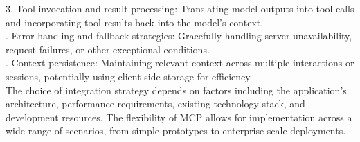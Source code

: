 3. Tool invocation and result processing: Translating model outputs into tool calls and incorporating tool results back into the model's context.\\ . Error handling and fallback strategies: Gracefully handling server unavailability, request failures, or other exceptional conditions.\\ . Context persistence: Maintaining relevant context across multiple interactions or sessions, potentially using client-side storage for efficiency.\\ \newline
The choice of integration strategy depends on factors including the application's architecture, performance requirements, existing technology stack, and development resources. The flexibility of MCP allows for implementation across a wide range of scenarios, from simple prototypes to enterprise-scale deployments.\\
